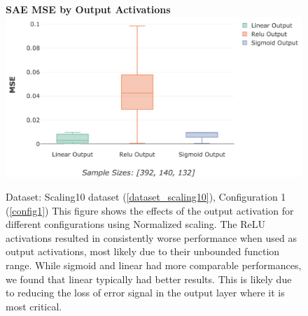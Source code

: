 \documentclass[a4paper,11pt,oneside]{article}
\theoremstyle{plain}
\theoremstyle{definition}
\begin{document}
	\begin{figure}[H]
		\begin{center}
			\centering
			\textbf{SAE MSE by Output Activations}
			\includegraphics[scale=0.4]{images/results/8_7_network/actual_mse_output.png}
			\caption[MSE by Output Activations]
			{Dataset: Scaling10 dataset (\ref{dataset_scaling10}), Configuration 1 (\ref{config1})
				\newline This figure shows the effects of the output activation for different configurations using Normalized scaling. The ReLU activations resulted in consistently worse performance when used as output activations, most likely due to their unbounded function range. While sigmoid and linear had more comparable performances, we found that linear typically had better results. This is likely due to reducing the loss of error signal in the output layer where it is most critical.}
			\label{figure-actual_mse_output}
		\end{center}
	\end{figure}
		
\end{document}
